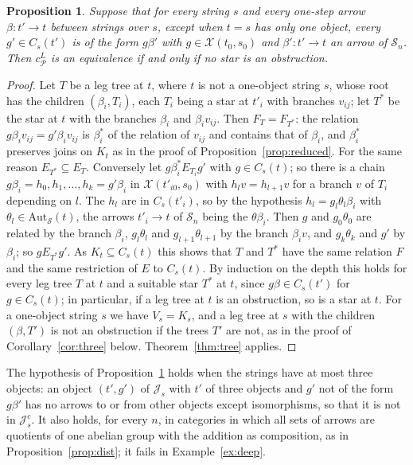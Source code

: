 \documentclass[11pt]{amsart}
\newtheorem{prop}[thm]{Proposition}
\theoremstyle{definition}
\newcommand{\Aut}{\mathrm{Aut}}
\newcommand{\cX}{\mathcal X}
\newcommand{\cP}{\mathcal P}
\newcommand{\cS}{\mathcal S}
\newcommand{\cJ}{\mathcal J}
\begin{document}
\begin{prop}\label{prop:lift}
Suppose that for every string $s$ and every one-step arrow
$\beta\colon t'\to t$ between strings over $s$, except when $t=s$ has
only one object, every $g'\in C_s(t')$ is of the form $g\beta'$ with
$g\in\cX(t_0,s_0)$ and $\beta'\colon t'\to t$ an arrow of $\cS_n$.
Then $c^L_\cP$ is an equivalence if and only if no star is an
obstruction.
\end{prop}
\begin{proof}
Let $T$ be a leg tree at $t$, where $t$ is not a one-object string
$s$, whose root has the children $(\beta_i,T_i)$, each $T_i$ being a
star at $t'_i$ with branches $v_{ij}$; let $T^*$ be the star at $t$
with the branches $\beta_i$ and $\beta_iv_{ij}$. Then $F_T=F_{T^*}$:
the relation $g\beta_iv_{ij}=g'\beta_iv_{ij}$ is $\beta_i^*$ of the
relation of $v_{ij}$ and contains that of $\beta_i$, and $\beta_i^*$
preserves joins on $K_t$ as in the proof of
Proposition~\ref{prop:reduced}. For the same reason $E_{T^*}\subseteq
E_T$. Conversely let $g\mathrel{\beta_i^*E_{T_i}}g'$ with $g\in C_s(t)$;
so there is a chain $g\beta_i=h_0,h_1,\dots,h_k=g'\beta_i$ in
$\cX(t'_{i0},s_0)$ with $h_{l}v=h_{l+1}v$ for a branch $v$ of $T_i$
depending on $l$. The $h_l$ are in $C_s(t'_i)$, so by the hypothesis
$h_l=g_l\theta_l\beta_i$ with $\theta_l\in\Aut_{\cS}(t)$, the arrows
$t'_i\to t$ of $\cS_n$ being the $\theta\beta_i$. Then $g$ and
$g_0\theta_0$ are related by the branch $\beta_i$, $g_l\theta_l$ and
$g_{l+1}\theta_{l+1}$ by the branch $\beta_iv$, and $g_k\theta_k$ and
$g'$ by $\beta_i$; so $g\mathrel{E_{T^*}}g'$. As $K_t\subseteq C_s(t)$
this shows that $T$ and $T^*$ have the same relation $F$ and the same
restriction of $E$ to $C_s(t)$. By induction on the depth this holds
for every leg tree $T$ at $t$ and a suitable star $T^*$ at $t$, since
$g\beta\in C_s(t')$ for $g\in C_s(t)$; in particular, if a leg tree at
$t$ is an obstruction, so is a star at $t$. For a
one-object string $s$ we have $V_s=K_s$, and a leg tree at $s$ with
the children $(\beta,T')$ is not an obstruction if the trees $T'$ are
not, as in the proof of Corollary~\ref{cor:three} below.
Theorem~\ref{thm:tree} applies.
\end{proof}

The hypothesis of Proposition~\ref{prop:lift} holds when the strings
have at most three objects: an object $(t',g')$ of $\cJ_s$ with $t'$ of
three objects and $g'$ not of the form $g\beta'$ has no arrows to or
from other objects except isomorphisms, so that it is not in
$\cJ^c_s$. It also holds, for every $n$, in categories in which
all sets of arrows are quotients of one abelian group with the
addition as composition, as in Proposition~\ref{prop:dist}; it fails
in Example~\ref{ex:deep}.
\end{document}
